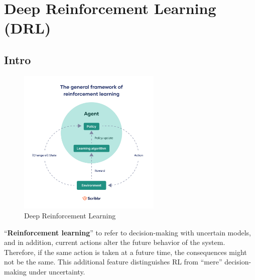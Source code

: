 \chapter{Deep Reinforcement Learning (DRL)}\label{Deep Reinforcement Learning (DRL)}

\section*{Intro \cite{drl-1}}

\begin{table}[H]
    \begin{minipage}{0.45\linewidth}
        \begin{figure}[H]
            \centering
            \includegraphics[height=7cm]{Pictures/deep-reinforcement-learning/drl-flow.jpg}
            \caption{Deep Reinforcement Learning}
        \end{figure}        
    \end{minipage}
    \hfill
    \begin{minipage}{0.45\linewidth}
        “\textbf{Reinforcement learning}” to refer to decision-making with uncertain models, and in addition, current actions alter the future behavior of the system. Therefore, if the same action is taken at a future time, the consequences might not be the same. This additional feature distinguishes RL from “mere” decision-making under uncertainty.\cite{arxiv-2304.00803}
    \end{minipage}
\end{table}








































